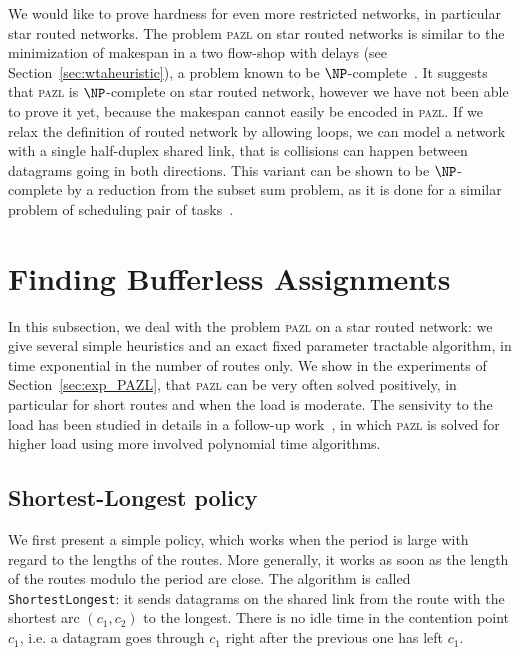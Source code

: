\documentclass[a4paper,10pt]{journal}
\newcommand\shortestlongest{\texttt{ShortestLongest}\xspace}
\newcommand\pazl{\textsc{pazl}\xspace}
\begin{document}
	We would like to prove hardness for even more restricted networks, in particular star routed networks.
   The problem \pazl on star routed networks is similar to the minimization of makespan in a two flow-shop with delays (see Section~\ref{sec:wtaheuristic}), a problem known to be $\NP$-complete~\cite{yu2004minimizing}. It suggests that \pazl is $\NP$-complete on star routed network, however we have not been able to prove it yet,  because the makespan cannot easily be encoded in \pazl. If we relax the definition of routed network by allowing loops,  we can model a network with a single half-duplex shared link, that is collisions can happen between datagrams going in both directions. This variant can be shown to be $\NP$-complete by a reduction from the subset sum problem, as it is done for a similar problem of scheduling pair of tasks~\cite{orman1997complexity}.
  

\section{Finding Bufferless Assignments} \label{sec:PAZL}
  
  In this subsection, we deal with the problem \pazl on a star routed network: 
  we give several simple heuristics and an exact fixed parameter tractable algorithm, in time exponential in the number of routes only. We show in the experiments of Section~\ref{sec:exp_PAZL}, that \pazl can be very often solved positively, in particular for short routes and when the load is moderate. The sensivity to the load has been studied in details in a follow-up work~\cite{guiraud2020scheduling}, in which \pazl is solved for higher load using more involved polynomial time algorithms. 
  
	\subsection{Shortest-Longest policy}
    

    We first present a simple policy, which works when the period is large with regard to the lengths of the routes. More generally, it works as soon as the length of the routes modulo the period are close. The algorithm is called \shortestlongest: it sends datagrams on the shared link from the route with the shortest arc $(c_1,c_2)$ to the longest. There is no idle time in the contention point $c_1$, i.e. a datagram goes through $c_1$ right after the previous one has left $c_1$.
      
\end{document}
